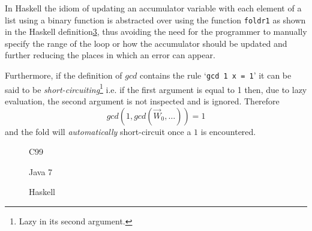 In Haskell the idiom of updating an accumulator variable with each element of a list using a binary function is abstracted over using the function \lstinline|foldr1| as shown in the Haskell definition\ref{fig:gcds:haskell}, thus avoiding the need for the programmer to manually specify the range of the loop or how the accumulator should be updated and further reducing the places in which an error can appear.

Furthermore, if the definition of $gcd$ contains the rule `\lstinline|gcd 1 x = 1|' it can be said to be \emph{short-circuiting}\footnote{Lazy in its second argument.} i.e. if the first argument is equal to 1 then, due to lazy evaluation, the second argument is not inspected and is ignored. Therefore $$gcd (1, gcd (\vec{W}_0,\ldots )) = 1$$ and the fold will \emph{automatically} short-circuit once a $1$ is encountered.

\begin{figure}
\label{fig:gcds:c}

\caption{C99}
\end{figure}
\begin{figure}
\label{fig:gcds:java}

\caption{Java 7}
\end{figure}
\begin{figure}
\label{fig:gcds:haskell}

\caption{Haskell}
\end{figure}





